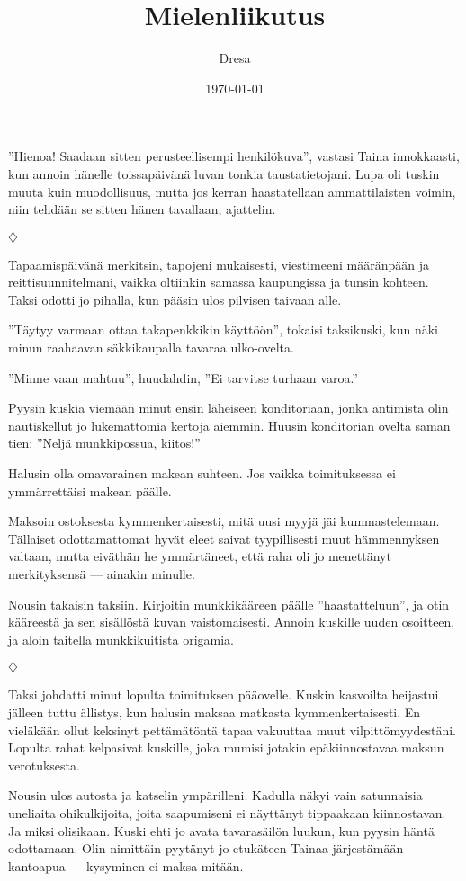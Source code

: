 ﻿\documentclass[a4paper, 12pt, finnish]{article}
\title{Mielenliikutus}
\author{Dresa}
\date{\today}
\newcommand{\q}[1]{''#1''}
\def\jump{\vspace{2mm} \centerline{$\diamondsuit$} \vspace{2mm}}
\begin{document}
\maketitle

\q{Hienoa! Saadaan sitten perusteellisempi henkilökuva}, vastasi Taina
innokkaasti, kun annoin hänelle toissapäivänä luvan tonkia
taustatietojani. Lupa oli tuskin muuta kuin muodollisuus,
mutta jos kerran haastatellaan ammattilaisten voimin,
niin tehdään se sitten hänen tavallaan, ajattelin. 


\jump


Tapaamispäivänä merkitsin, tapojeni mukaisesti, viestimeeni
määränpään ja reittisuunnitelmani, vaikka oltiinkin samassa kaupungissa
ja tunsin kohteen.
Taksi odotti jo pihalla, kun pääsin ulos pilvisen taivaan alle.

\q{Täytyy varmaan ottaa takapenkkikin käyttöön}, tokaisi taksikuski,
kun näki minun raahaavan säkkikaupalla tavaraa ulko-ovelta.

\q{Minne vaan mahtuu}, huudahdin, \q{Ei tarvitse turhaan varoa.}

Pyysin kuskia viemään minut ensin läheiseen konditoriaan,
jonka antimista olin nautiskellut jo lukemattomia kertoja aiemmin.
Huusin konditorian ovelta saman tien: \q{Neljä munkkipossua, kiitos!}

Halusin olla omavarainen makean suhteen. Jos vaikka toimituksessa ei ymmärrettäisi makean päälle.

Maksoin ostoksesta kymmenkertaisesti, mitä uusi myyjä jäi kummastelemaan.
Tällaiset odottamattomat hyvät eleet saivat tyypillisesti
muut hämmennyksen valtaan, mutta eiväthän he ymmärtäneet,
että raha oli jo menettänyt merkityksensä --- ainakin minulle.

Nousin takaisin taksiin. Kirjoitin munkkikääreen päälle \q{haastatteluun},
ja otin kääreestä ja sen sisällöstä kuvan vaistomaisesti. Annoin
kuskille uuden osoitteen, ja aloin taitella munkkikuitista origamia.


\jump


Taksi johdatti minut lopulta toimituksen pääovelle. Kuskin kasvoilta
heijastui jälleen tuttu ällistys, kun halusin maksaa matkasta
kymmenkertaisesti. En vieläkään ollut keksinyt pettämätöntä tapaa
vakuuttaa muut vilpittömyydestäni. Lopulta rahat kelpasivat kuskille,
joka mumisi jotakin epäkiinnostavaa maksun verotuksesta.
 
Nousin ulos autosta ja katselin ympärilleni. Kadulla näkyi vain
satunnaisia uneliaita ohikulkijoita, joita saapumiseni ei näyttänyt
tippaakaan kiinnostavan. Ja miksi olisikaan. Kuski ehti jo avata
tavarasäilön luukun, kun pyysin häntä odottamaan. Olin nimittäin
pyytänyt jo etukäteen Tainaa järjestämään kantoapua --- kysyminen ei
maksa mitään.
\end{document}
